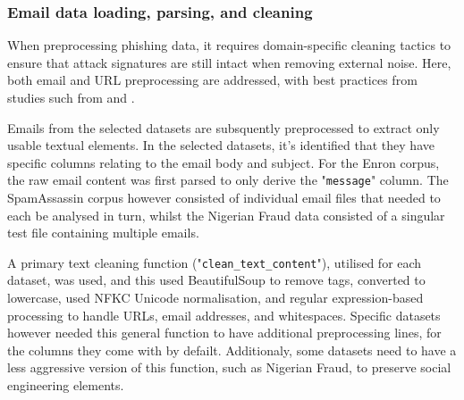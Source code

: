 
\subsubsection*{Email data loading, parsing, and cleaning}
When preprocessing phishing data, it requires domain-specific cleaning tactics to ensure that attack signatures are still intact when removing external noise. Here, both email and URL preprocessing are addressed, with best practices from studies such from \cite{zamir2020phishing} and \cite{ahmad2024across}.\newline

\noindent Emails from the selected datasets are subsquently preprocessed to extract only usable textual elements. In the selected datasets, it's identified that they have specific columns relating to the email body and subject. For the Enron corpus, the raw email content was first parsed to only derive the "\texttt{message}" column. The SpamAssassin corpus however consisted of individual email files that needed to each be analysed in turn, whilst the Nigerian Fraud data consisted of a singular test file containing multiple emails.\newline

\noindent A primary text cleaning function ("\texttt{clean\_text\_content}"), utilised for each dataset, was used, and this used BeautifulSoup to remove tags, converted to lowercase, used NFKC Unicode normalisation, and regular expression-based processing to handle URLs, email addresses, and whitespaces. Specific datasets however needed this general function to have additional preprocessing lines, for the columns they come with by defailt. Additionaly, some datasets need to have a less aggressive version of this function, such as Nigerian Fraud, to preserve social engineering elements.
